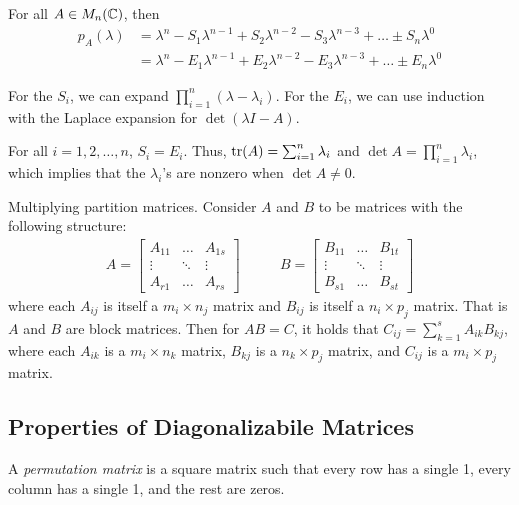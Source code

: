 \begin{proposition}
For all $A \in M_n(\mathbb C)$, then 
\begin{align*}
    p_A(\lambda) &= \lambda^n - S_1\lambda^{n-1} + S_2\lambda^{n-2} - S_3\lambda^{n-3} + \dots \pm S_n\lambda^0 \\ 
                 &= \lambda^n - E_1\lambda^{n-1} + E_2\lambda^{n-2} - E_3\lambda^{n-3} + \dots \pm E_n\lambda^0
\end{align*}
\end{proposition}
\noindent For the $S_i$, we can expand $\prod_{i=1}^n (\lambda - \lambda_i)$. For the $E_i$, we can use induction with the Laplace expansion for $\det(\lambda I - A)$.

\begin{note*}
For all $i = 1,2,\dots,n$, $S_i = E_i$. Thus, $\operatorname{tr}(A) = \sum_{i=1}^n \lambda_i$ and $\det A = \prod_{i=1}^n \lambda_i$, which implies that the $\lambda_i$'s are nonzero when $\det A \not=0$.
\end{note*}

\begin{lemma}
\label{lem:multiplying-partition-matrices}
Multiplying partition matrices. Consider $A$ and $B$ to be matrices with the following structure:
\begin{align*}
A = \begin{bmatrix} 
A_{11} & \dots & A_{1s} \\
\vdots & \ddots & \vdots \\
A_{r1} & \dots & A_{rs}
\end{bmatrix} \quad&\quad
B = \begin{bmatrix} 
B_{11} & \dots & B_{1t} \\
\vdots & \ddots & \vdots \\
B_{s1} & \dots & B_{st}
\end{bmatrix}  
\end{align*}
where each $A_{ij}$ is itself a $m_i \times n_j$ matrix and $B_{ij}$ is itself a $n_i \times p_j$ matrix. That is $A$ and $B$ are block matrices. Then for $AB = C$, it holds that $C_{ij} = \sum_{k=1}^s A_{ik}B_{kj}$, where each $A_{ik}$ is a $m_i \times n_k$ matrix, $B_{kj}$ is a $n_k \times p_j$ matrix, and $C_{ij}$ is a $m_i \times p_j$ matrix.
\end{lemma}

\subsection{Properties of Diagonalizabile Matrices}
\begin{definition}
\label{def:permutation-matrices}
A \textit{permutation matrix} is a square matrix such that every row has a single 1, every column has a single 1, and the rest are zeros.
\end{definition}

